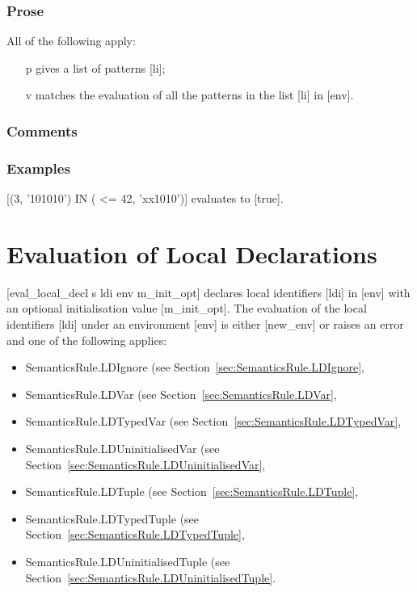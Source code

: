 \documentclass{book}
\begin{document}
    \subsubsection{Prose}
    All of the following apply:
    \begin{itemize}
    \item [p] gives a list of patterns [li];
    \item [v] matches the evaluation of all the patterns in the list [li] in [env].
    \end{itemize}

    \subsubsection{Comments}

    \subsubsection{Examples}
    [(3, '101010') IN {( <= 42, 'xx1010')}] evaluates to [true].

\section{Evaluation of Local Declarations}

[eval\_local\_decl s ldi env m\_init\_opt] declares local identifiers [ldi] in
[env] with an optional initialisation value [m\_init\_opt].  The evaluation of
the local identifiers [ldi] under an environment [env] is either [new\_env] or
raises an error and one of the following applies:
\begin{itemize}
\item SemanticsRule.LDIgnore (see Section~\ref{sec:SemanticsRule.LDIgnore},
\item SemanticsRule.LDVar (see Section~\ref{sec:SemanticsRule.LDVar},
\item SemanticsRule.LDTypedVar (see Section~\ref{sec:SemanticsRule.LDTypedVar},
\item SemanticsRule.LDUninitialisedVar (see Section~\ref{sec:SemanticsRule.LDUninitialisedVar},
\item SemanticsRule.LDTuple (see Section~\ref{sec:SemanticsRule.LDTuple},
\item SemanticsRule.LDTypedTuple (see Section~\ref{sec:SemanticsRule.LDTypedTuple},
\item SemanticsRule.LDUninitialisedTuple (see Section~\ref{sec:SemanticsRule.LDUninitialisedTuple}.
\end{itemize}
\end{document}

